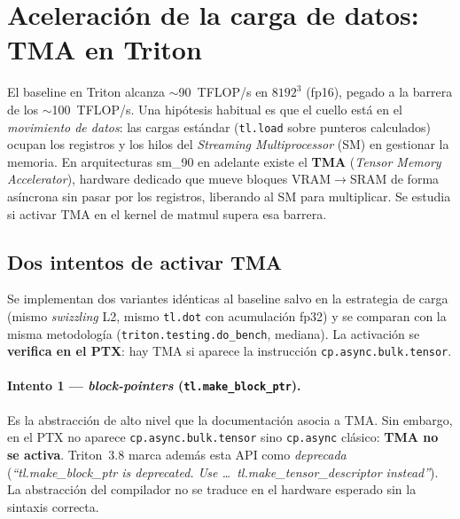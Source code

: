 
\section{Aceleración de la carga de datos: TMA en Triton}
\label{sec:tma}

El baseline en Triton alcanza $\sim$90~TFLOP/s en $8192^3$ (fp16), pegado a la
barrera de los $\sim$100~TFLOP/s. Una hipótesis habitual es que el cuello está en
el \emph{movimiento de datos}: las cargas estándar (\texttt{tl.load} sobre punteros
calculados) ocupan los registros y los hilos del \emph{Streaming Multiprocessor}
(SM) en gestionar la memoria. En arquitecturas sm\_90 en adelante existe el
\textbf{TMA} (\emph{Tensor Memory Accelerator}), hardware dedicado que mueve bloques
VRAM$\rightarrow$SRAM de forma asíncrona sin pasar por los registros, liberando al SM
para multiplicar. Se estudia si activar TMA en el kernel de matmul supera esa barrera.

\subsection{Dos intentos de activar TMA}

Se implementan dos variantes idénticas al baseline salvo en la estrategia de carga
(mismo \emph{swizzling} L2, mismo \texttt{tl.dot} con acumulación fp32) y se comparan
con la misma metodología (\texttt{triton.testing.do\_bench}, mediana). La activación
se \textbf{verifica en el PTX}: hay TMA si aparece la instrucción
\texttt{cp.async.bulk.tensor}.

\paragraph{Intento 1 --- \emph{block-pointers} (\texttt{tl.make\_block\_ptr}).}
Es la abstracción de alto nivel que la documentación asocia a TMA. Sin embargo, en el
PTX no aparece \texttt{cp.async.bulk.tensor} sino \texttt{cp.async} clásico: \textbf{TMA
no se activa}. Triton~3.8 marca además esta API como \emph{deprecada}
(\emph{``tl.make\_block\_ptr is deprecated. Use \dots\ tl.make\_tensor\_descriptor
instead''}). La abstracción del compilador no se traduce en el hardware esperado sin
la sintaxis correcta.

